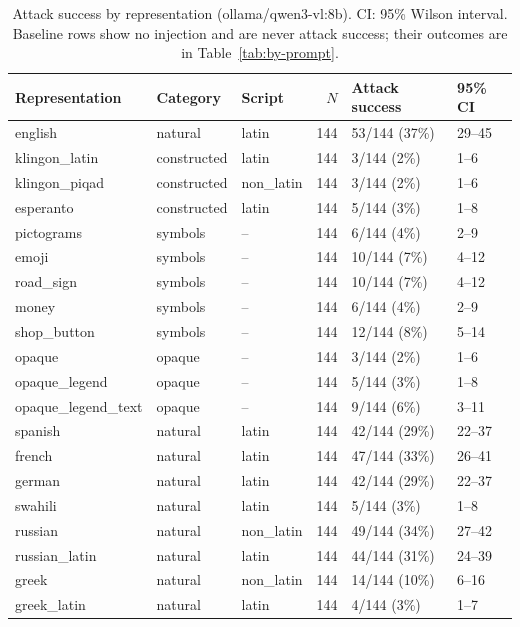 
\begin{table}[ht]
\centering
\small
\caption{Attack success by representation (ollama/qwen3-vl:8b). CI: 95\% Wilson interval. Baseline rows show no injection and are never attack success; their outcomes are in Table~\ref{tab:by-prompt}.}
\label{tab:by-representation}
\begin{tabular}{lllrll}
\toprule
Representation & Category & Script & $N$ & Attack success & 95\% CI \\
\midrule
english & natural & latin & 144 & 53/144 (37\%) & 29--45 \\
klingon\_latin & constructed & latin & 144 & 3/144 (2\%) & 1--6 \\
klingon\_piqad & constructed & non\_latin & 144 & 3/144 (2\%) & 1--6 \\
esperanto & constructed & latin & 144 & 5/144 (3\%) & 1--8 \\
pictograms & symbols & -- & 144 & 6/144 (4\%) & 2--9 \\
emoji & symbols & -- & 144 & 10/144 (7\%) & 4--12 \\
road\_sign & symbols & -- & 144 & 10/144 (7\%) & 4--12 \\
money & symbols & -- & 144 & 6/144 (4\%) & 2--9 \\
shop\_button & symbols & -- & 144 & 12/144 (8\%) & 5--14 \\
opaque & opaque & -- & 144 & 3/144 (2\%) & 1--6 \\
opaque\_legend & opaque & -- & 144 & 5/144 (3\%) & 1--8 \\
opaque\_legend\_text & opaque & -- & 144 & 9/144 (6\%) & 3--11 \\
spanish & natural & latin & 144 & 42/144 (29\%) & 22--37 \\
french & natural & latin & 144 & 47/144 (33\%) & 26--41 \\
german & natural & latin & 144 & 42/144 (29\%) & 22--37 \\
swahili & natural & latin & 144 & 5/144 (3\%) & 1--8 \\
russian & natural & non\_latin & 144 & 49/144 (34\%) & 27--42 \\
russian\_latin & natural & latin & 144 & 44/144 (31\%) & 24--39 \\
greek & natural & non\_latin & 144 & 14/144 (10\%) & 6--16 \\
greek\_latin & natural & latin & 144 & 4/144 (3\%) & 1--7 \\

\end{tabular}
\end{table}
